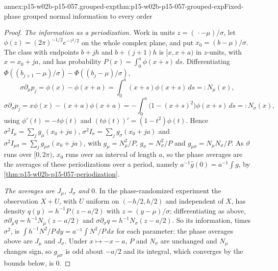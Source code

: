 \begin{annexitem}{annex:p15-w02b-p15-057.grouped-exp}{thm:p15-w02b-p15-057-grouped-exp}{Fixed-phase grouped normal information to every order}
\begin{proof}
\emph{The information as a periodization.} Work in units
\(z=(\,\cdot-\mu)/\sigma\), let \(\phi(z)=(2\pi)^{-1/2}e^{-z^2/2}\) on the
whole complex plane, and put \(x_0=(b-\mu)/\sigma\). The class with
endpoints \(b+jh\) and \(b+(j+1)h\) is \([x,x+a)\) in \(z\)-units, with
\(x=x_0+ja\), and has probability
\(P(x)=\int_0^a\phi(x+s)\,ds\). Differentiating
\(\Phi((b_{j+1}-\mu)/\sigma)-\Phi((b_j-\mu)/\sigma)\),
\[
 \sigma\partial_\mu p_j=\phi(x)-\phi(x+a)=\int_0^a(x+s)\phi(x+s)\,ds=:N_\mu(x),
\]
\[
 \sigma\partial_\sigma p_j=x\phi(x)-(x+a)\phi(x+a)
 =-\int_0^a\bigl(1-(x+s)^2\bigr)\phi(x+s)\,ds=:N_\sigma(x),
\]
using \(\phi'(t)=-t\phi(t)\) and \((t\phi(t))'=(1-t^2)\phi(t)\). Hence
\(\sigma^2I_\mu=\sum_jg_\mu(x_0+ja)\), \(\sigma^2I_\sigma=\sum_jg_\sigma(x_0+ja)\)
and \(\sigma^2I_{\mu\sigma}=\sum_jg_{\mu\sigma}(x_0+ja)\), with
\(g_\mu=N_\mu^2/P\), \(g_\sigma=N_\sigma^2/P\) and
\(g_{\mu\sigma}=N_\mu N_\sigma/P\). As \(\vartheta\) runs over
\([0,2\pi)\), \(x_0\) runs over an interval of length \(a\), so the phase
averages are the averages of these periodizations over a period, namely
\(a^{-1}\widehat g(0)=a^{-1}\int g\), by
\cref{thm:p15-w02b-p15-057-periodization}.

\emph{The averages are \(J_\mu\), \(J_\sigma\) and \(0\).} In the
phase-randomized experiment the observation \(X+U\), with \(U\) uniform on
\((-h/2,h/2)\) and independent of \(X\), has density
\(q(y)=h^{-1}P(z-a/2)\) with \(z=(y-\mu)/\sigma\); differentiating as above,
\(\sigma\partial_\mu q=h^{-1}N_\mu(z-a/2)\) and
\(\sigma\partial_\sigma q=h^{-1}N_\sigma(z-a/2)\). So its information,
times \(\sigma^2\), is \(\int h^{-1}N^2/P\,dy=a^{-1}\int N^2/P\,dx\) for
each parameter: the phase averages above are \(J_\mu\) and \(J_\sigma\).
Under \(x\mapsto-x-a\), \(P\) and \(N_\sigma\) are unchanged and
\(N_\mu\) changes sign, so \(g_{\mu\sigma}\) is odd about \(-a/2\) and its
integral, which converges by the bounds below, is \(0\).


\end{proof}
\end{annexitem}
